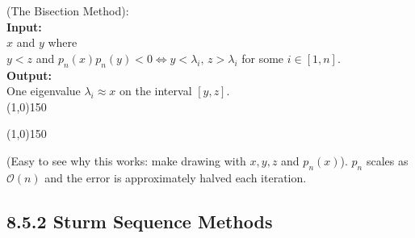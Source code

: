 \begin{algo}
{
%
	(The Bisection Method):
%
}\\
\textbf{Input: }
{
%
	\\$x$ and $y$ where
	\\$y<z$ and $p_n(x)p_n(y)<0\Leftrightarrow y<\lambda_i,\,z>\lambda_i$ for some $i\in[1,n] $.
%
}\\
\textbf{Output: }
{
%
	\\One eigenvalue $\lambda_i \approx x$ on the interval $[y,z]$.
%
}\\
\line(1,0){150}
\begin{algorithmic}
%
	\Else{}
	\EndIf
\EndWhile{}
%
\end{algorithmic}
\line(1,0){150}
\end{algo}
%
(Easy to see why this works: make drawing with $x,y,z$ and $p_n(x)$).
$p_n$ scales as $\mathcal O(n)$ and the error is approximately halved each iteration.


\subsection*{8.5.2 Sturm Sequence Methods}%

